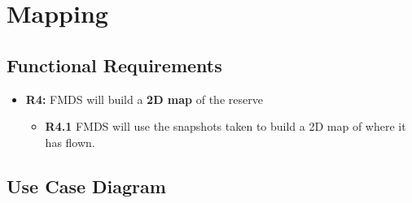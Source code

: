 \section{Mapping}

\subsection{Functional Requirements}

	\begin{flushleft}
		\begin{itemize}
			\item{\textbf{R4:}} FMDS will build a \textbf{2D map} of the reserve

				\begin{itemize}
					\item{\textbf{R4.1}} FMDS will use the snapshots taken to build a 2D map of where it has flown.
				\end{itemize}
		\end{itemize}
	\end{flushleft}

\subsection{Use Case Diagram}
	\begin{center}
	\end{center}
